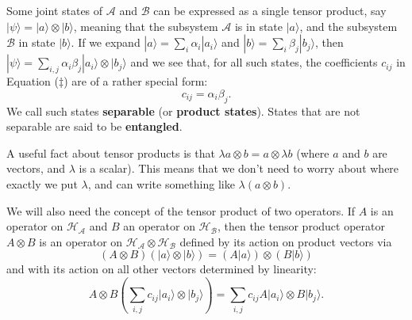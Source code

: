 \documentclass[fleqn,a4paper]{article}
\theoremstyle{definition}
\theoremstyle{definition}
\theoremstyle{definition}
\theoremstyle{definition}
\theoremstyle{remark}
\begin{document}
Some joint states of \(\mathcal{A}\) and \(\mathcal{B}\) can be expressed as a single tensor product, say \(|\psi\rangle=|a\rangle\otimes|b\rangle\), meaning that the subsystem \(\mathcal{A}\) is in state \(|a\rangle\), and the subsystem \(\mathcal{B}\) in state \(|b\rangle\).
If we expand \(|a\rangle=\sum_i\alpha_i|a_i\rangle\) and \(|b\rangle=\sum_i\beta_j|b_j\rangle\), then \(|\psi\rangle=\sum_{i,j}\alpha_i\beta_j|a_i\rangle\otimes|b_j\rangle\) and we see that, for all such states, the coefficients \(c_{ij}\) in Equation (\(\ddagger\)) are of a rather special form:
\[
  c_{ij} = \alpha_i\beta_j.
\]
We call such states \textbf{separable} (or \textbf{product states}).
States that are not separable are said to be \textbf{entangled}.

A useful fact about tensor products is that \(\lambda a\otimes b = a\otimes\lambda b\) (where \(a\) and \(b\) are vectors, and \(\lambda\) is a scalar).
This means that we don't need to worry about where exactly we put \(\lambda\), and can write something like \(\lambda(a\otimes b)\).

We will also need the concept of the tensor product of two operators.
If \(A\) is an operator on \(\mathcal{H}_{\mathcal{A}}\) and \(B\) an operator on \(\mathcal{H}_{\mathcal{B}}\), then the tensor product operator \(A\otimes B\) is an operator on \(\mathcal{H}_{\mathcal{A}}\otimes\mathcal{H}_{\mathcal{B}}\) defined by its action on product vectors via
\[
  (A\otimes B)(|a\rangle\otimes|b\rangle) = (A|a\rangle)\otimes (B|b\rangle)
\]
and with its action on all other vectors determined by linearity:
\[
  A\otimes B \left( \sum_{i,j} c_{ij}|a_i\rangle\otimes|b_j\rangle \right)
  = \sum_{i,j}c_{ij} A|a_i\rangle\otimes B|b_j\rangle.
\]
\end{document}
